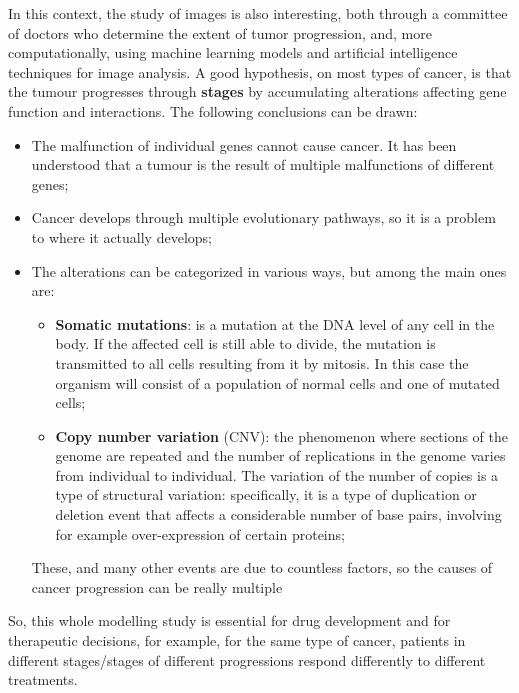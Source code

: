 In this context, the study of images is also interesting, both through a committee of doctors 
who determine the extent of tumor progression, and, more computationally, using machine learning 
models and artificial intelligence techniques for image analysis. A good hypothesis, on most
types of cancer, is that the tumour progresses through \textbf{stages} by accumulating 
alterations affecting gene function and interactions. The following conclusions can be drawn:
\begin{itemize}
    \item The malfunction of individual genes cannot cause cancer. It has been understood that 
        a tumour is the result of multiple malfunctions of different genes;
    \item Cancer develops through multiple evolutionary pathways, so it is a problem to 
        where it actually develops;
    \item The alterations can be categorized in various ways, but among the main ones are:
        \begin{itemize}
            \item \textbf{Somatic mutations}: is a mutation at the DNA level of any cell in 
                the body. If the affected cell is still able to divide, the mutation is 
                transmitted to all cells resulting from it by mitosis. In this case the 
                organism will consist of a population of normal cells and one of mutated cells;
            \item \textbf{Copy number variation} (CNV): the phenomenon where sections of the
                genome are repeated and the number of replications in the genome varies from
                individual to individual. The variation of the number of copies is a type of
                structural variation: specifically, it is a type of duplication or deletion 
                event that affects a considerable number of base pairs, involving for example over-expression of certain proteins;
        \end{itemize}
        These, and many other events are due to countless factors, so the causes of cancer 
        progression can be really multiple
\end{itemize}

So, this whole modelling study is essential for drug development and for therapeutic decisions,
for example, for the same type of cancer, patients in different stages/stages of different 
progressions respond differently to different treatments.

